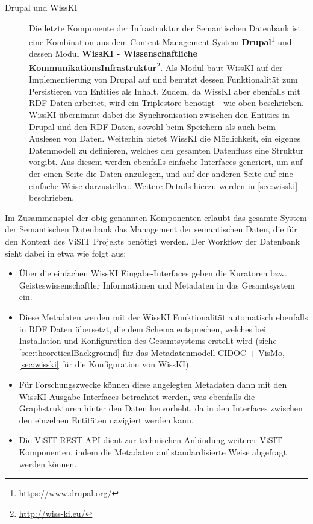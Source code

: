 \begin{description}
	\item[Drupal und WissKI] Die letzte Komponente der Infrastruktur der Semantischen Datenbank ist eine Kombination aus dem Content Management System \textbf{Drupal}\footnote{\url{https://www.drupal.org/}} und dessen Modul \textbf{WissKI - Wissenschaftliche KommunikationsInfrastruktur}\footnote{\url{http://wiss-ki.eu/}}. Als Modul baut WissKI auf der Implementierung von Drupal auf und benutzt dessen Funktionalität zum Persistieren von Entities als Inhalt. Zudem, da WissKI aber ebenfalls mit RDF Daten arbeitet, wird ein Triplestore benötigt - wie oben beschrieben. WissKI übernimmt dabei die Synchronisation zwischen den Entities in Drupal und den RDF Daten, sowohl beim Speichern als auch beim Auslesen von Daten. Weiterhin bietet WissKI die Möglichkeit, ein eigenes Datenmodell zu definieren, welches den gesamten Datenfluss eine Struktur vorgibt. Aus diesem werden ebenfalls einfache Interfaces generiert, um auf der einen Seite die Daten anzulegen, und auf der anderen Seite auf eine einfache Weise darzustellen. Weitere Details hierzu werden in \autoref{sec:wisski} beschrieben.
\end{description}

Im Zusammenspiel der obig genannten Komponenten erlaubt das gesamte System der Semantischen Datenbank das Management der semantischen Daten, die für den Kontext des ViSIT Projekts benötigt werden. Der Workflow der Datenbank sieht dabei in etwa wie folgt aus:

\begin{itemize}
	\item Über die einfachen WissKI Eingabe-Interfaces geben die Kuratoren bzw. Geisteswissenschaftler Informationen und Metadaten in das Gesamtsystem ein.
	\item Diese Metadaten werden mit der WissKI Funktionalität automatisch ebenfalls in RDF Daten übersetzt, die dem Schema entsprechen, welches bei Installation und Konfiguration des Gesamtsystems erstellt wird (siehe \autoref{sec:theoreticalBackground} für das Metadatenmodell CIDOC + VisMo, \autoref{sec:wisski} für die Konfiguration von WissKI).
	\item Für Forschungszwecke können diese angelegten Metadaten dann mit den WissKI Ausgabe-Interfaces betrachtet werden, was ebenfalls die Graphstrukturen hinter den Daten hervorhebt, da in den Interfaces zwischen den einzelnen Entitäten navigiert werden kann.
	\item Die ViSIT REST API dient zur technischen Anbindung weiterer ViSIT Komponenten, indem die Metadaten auf standardisierte Weise abgefragt werden können.
\end{itemize}

